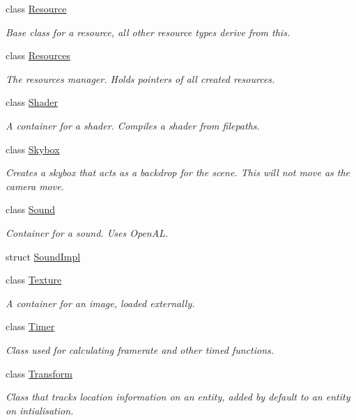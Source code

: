 \begin{DoxyCompactItemize}
class \hyperlink{classfrontier_1_1_resource}{Resource}
\begin{DoxyCompactList}\small\item\em Base class for a resource, all other resource types derive from this. \end{DoxyCompactList}\item 
class \hyperlink{classfrontier_1_1_resources}{Resources}
\begin{DoxyCompactList}\small\item\em The resources manager. Holds pointers of all created resources. \end{DoxyCompactList}\item 
class \hyperlink{classfrontier_1_1_shader}{Shader}
\begin{DoxyCompactList}\small\item\em A container for a shader. Compiles a shader from filepaths. \end{DoxyCompactList}\item 
class \hyperlink{classfrontier_1_1_skybox}{Skybox}
\begin{DoxyCompactList}\small\item\em Creates a skybox that acts as a backdrop for the scene. This will not move as the camera move. \end{DoxyCompactList}\item 
class \hyperlink{classfrontier_1_1_sound}{Sound}
\begin{DoxyCompactList}\small\item\em Container for a sound. Uses Open\+AL. \end{DoxyCompactList}\item 
struct \hyperlink{structfrontier_1_1_sound_impl}{Sound\+Impl}
\item 
class \hyperlink{classfrontier_1_1_texture}{Texture}
\begin{DoxyCompactList}\small\item\em A container for an image, loaded externally. \end{DoxyCompactList}\item 
class \hyperlink{classfrontier_1_1_timer}{Timer}
\begin{DoxyCompactList}\small\item\em Class used for calculating framerate and other timed functions. \end{DoxyCompactList}\item 
class \hyperlink{classfrontier_1_1_transform}{Transform}
\begin{DoxyCompactList}\small\item\em Class that tracks location information on an entity, added by default to an entity on intialisation. \end{DoxyCompactList}\item 

\end{DoxyCompactItemize}
